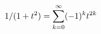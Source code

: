 \documentclass[preview]{standalone}
\begin{document}
\begin{align*}
\special{dvisvgm:raw <g id='unique000'>}1/(1+t^2)=\sum_{k=0}^{\infty}(-1)^kt^{2k}\special{dvisvgm:raw </g>}
\end{align*}
\end{document}
